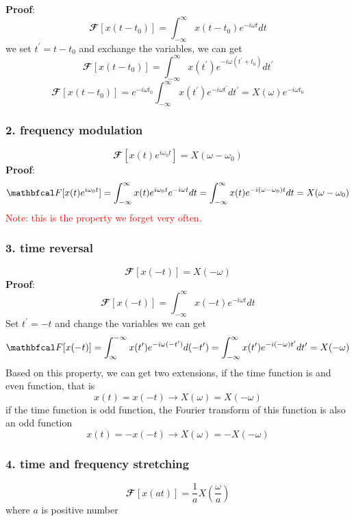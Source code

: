\documentclass[revised,endfloat]{geophysics}
\begin{document}
{\bf Proof}:
$$
{\mathbfcal F}[x(t-t_0)]  = \int_{-\infty}^{\infty} x(t - t_0) e^{-i\omega t} dt  
$$
we set $t^{\prime} = t - t_0$ and exchange the variables, we can get
$$
{\mathbfcal F}[x(t-t_0)]  = \int_{-\infty}^{\infty} x(t^{\prime}) e^{-i\omega (t^{\prime} + t_0)} d t^{\prime}  $$
$$
{\mathbfcal F}[x(t-t_0)] = e^{-i \omega t_0} \int_{-\infty}^{\infty} x(t^{\prime}) e^{-i\omega t^{\prime}} d t^{\prime} = X(\omega) e^{-i \omega t_0}
$$

\subsubsection{2. frequency modulation}
\begin{equation}
{\mathbfcal F}[x(t)e^{i \omega_0 t}] = X(\omega-\omega_0)
\end{equation}
{\bf Proof}:
$$
{\mathbfcal F}[x(t)e^{i \omega_0 t}]  = \int_{-\infty}^{\infty} x(t)e^{i \omega_0 t} e^{-i\omega t} dt  \\
=  \int_{-\infty}^{\infty} x(t) e^{-i (\omega-\omega_0) t} dt  =  X(\omega-\omega_0)
$$
\textcolor{red}{Note: this is the property we forget very often.}

\subsubsection{3. time reversal}
\begin{equation}
{\mathbfcal F}[x(-t)] = X(-\omega)
\end{equation}
{\bf Proof}:
$$ {\mathbfcal F}[x(-t)]  = \int_{-\infty}^{\infty} x(-t)e^{-i \omega t} dt  $$
Set $t^{\prime} = -t$ and change the variables we can get
$$ {\mathbfcal F}[x(-t)]  = \int_{\infty}^{-\infty} x(t^{\prime}) e^{-i \omega (-t^{\prime})} d (-t^{\prime}) \\
= \int_{-\infty}^{\infty} x(t^{\prime}) e^{-i (-\omega) t^{\prime}} d t^{\prime} \\
= X(-\omega)$$
Based on this property, we can get two extensions, if the time function is and even function, that is
$$x(t) = x(-t) \rightarrow X(\omega) = X(-\omega)$$
if the time function is odd function, the Fourier transform of this function is also an odd function
$$x(t) = -x(-t) \rightarrow X(\omega) = - X(-\omega)$$

\subsubsection{4. time and frequency stretching}
\begin{equation}
{\mathbfcal F}[x(at)] = \frac{1}{a}X(\frac{\omega}{a})
\end{equation}
where $a$ is positive number
\end{document}

